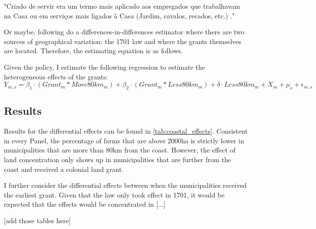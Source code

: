 \documentclass{article}
\begin{document}
"Criado de servir era um termo mais aplicado aos empregados que trabalhavam na Casa ou em serviços mais ligados à Casa (Jardim, cavalos, recados, etc.) ."

\parencite[p.~142]{De_Oliveira_Andrade1980-xz}

Or maybe, following \textcite{Barsanetti2021-hp} do a differences-in-differences estimator where there are two sources of geographical variation: the 1701 law and where the grants themselves are located. Therefore, the estimating equation is as follows. 

Given the policy, I estimate the following regression to estimate the heterogeneous effects of the grants:
\begin{equation}
  \label{eqn:livestock}
  Y_{m,s} = \beta_1 \cdot (Grant_m  * More80km_m) + \beta_2 \cdot (Grant_m * Less80km_m) + \delta \cdot  Less80km_m + X_{m} + \mu_s + \epsilon_{m,s}
\end{equation}


\subsection{Results}

Results for the differential effects can be found in \autoref{tab:coastal_effects}. 
Consistent in every Panel, the percentage of farms that are above 2000ha is strictly lower in municipalities that are more than 80km from the coast. However, the effect of land concentration only shows up in municipalities that are further from the coast and received a colonial land grant. 

I further consider the differential effects between when the municipalities received the earliest grant. 
Given that the law only took effect in 1701, it would be expected that the effects would be concentrated in [...]

[add those tables here]



\end{document}
